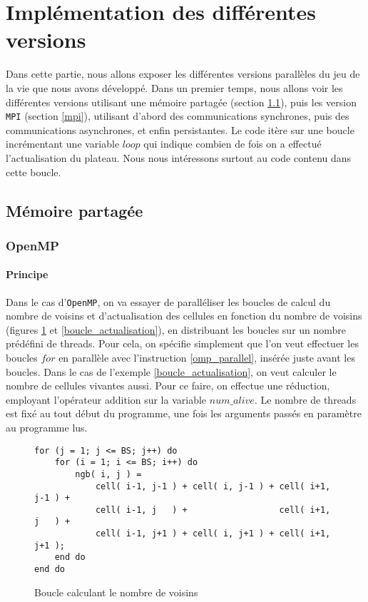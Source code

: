 \section{Implémentation des différentes versions} %
\label{sec:diff_rents_versions}
Dans cette partie, nous allons exposer les différentes versions parallèles du jeu de la vie que nous avons développé. Dans un premier temps, nous allons voir les différentes versions utilisant une mémoire partagée (section \ref{partagee}), puis les version \texttt{MPI} (section \ref{mpi}), utilisant d'abord des communications synchrones, puis des communications asynchrones, et enfin persistantes. Le code itère sur une boucle incrémentant une variable $loop$ qui indique combien de fois on a effectué l'actualisation du plateau.  Nous nous intéressons surtout au code contenu dans cette boucle.

\subsection{Mémoire partagée}
\label{partagee}

\subsubsection{OpenMP}
\label{openmp}
\paragraph{Principe}
Dans le cas d'\texttt{OpenMP}, on va essayer de paralléliser les boucles de calcul du nombre de voisins et d'actualisation des cellules en fonction du nombre de voisins (figures \ref{boucle_voisins} et \ref{boucle_actualisation}), en distribuant les boucles sur un nombre prédéfini de threads. Pour cela, on spécifie simplement que l'on veut effectuer les boucles $for$ en parallèle avec l'instruction \ref{omp_parallel}, insérée juste avant les boucles. Dans le cas de l'exemple \ref{boucle_actualisation}, on veut calculer le nombre de cellules vivantes aussi. Pour ce faire, on effectue une réduction, employant l'opérateur addition sur la variable $num\_alive$. Le nombre de threads est fixé au tout début du programme, une fois les arguments passés en paramètre au programme lus. 

\begin{figure}[!ht]
\begin{lstlisting}
for (j = 1; j <= BS; j++) do
	for (i = 1; i <= BS; i++) do
		ngb( i, j ) =
			cell( i-1, j-1 ) + cell( i, j-1 ) + cell( i+1, j-1 ) +
			cell( i-1, j   ) +                  cell( i+1, j   ) +
			cell( i-1, j+1 ) + cell( i, j+1 ) + cell( i+1, j+1 );
	end do
end do
\end{lstlisting}
\caption{Boucle calculant le nombre de voisins}
\label{boucle_voisins}
\end{figure}


